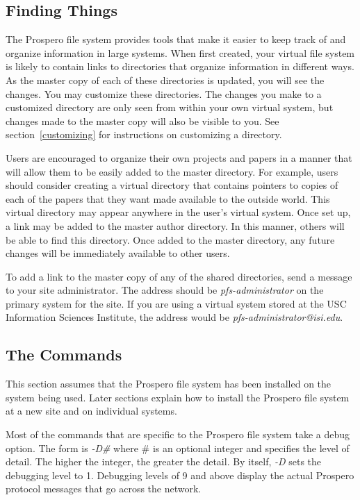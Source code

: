 \subsection{Finding Things}

The Prospero file system provides tools that make it easier to keep
track of and organize information in large systems.  When first
created, your virtual file system is likely to contain links to
directories that organize information in different ways.  As the
master copy of each of these directories is updated, you will see the
changes.  You may customize these directories.  The changes you make
to a customized directory are only seen from within your own virtual
system, but changes made to the master copy will also be visible to
you.  See section~\ref{customizing} for instructions on customizing a
directory.

Users are encouraged to organize their own projects and papers in a
manner that will allow them to be easily added to the master
directory.  For example, users should consider creating a virtual
directory that contains pointers to copies of each of the papers that
they want made available to the outside world.  This virtual directory
may appear anywhere in the user's virtual system.  Once set up, a link
may be added to the master author directory.  In this manner, others
will be able to find this directory.  Once added to the master
directory, any future changes will be immediately available to other
users.

To add a link to the master copy of any of the shared directories,
send a message to your site administrator.  The address should be {\it
pfs-administrator} on the primary system for the site.  If you are
using a virtual system stored at the USC Information Sciences Institute, the
address would be {\it pfs-administrator@isi.edu}.

\subsection{The Commands}

This section 
assumes that the Prospero file system has been installed on the system
being used.  Later sections explain how to install the Prospero file
system at a new site and on individual systems.

Most of the commands that are specific to the Prospero file system
take a debug option.  The form is {\em -D\#} where \# is an optional
integer and specifies the level of detail.  The higher the integer,
the greater the detail.  By itself, {\em -D} sets the debugging level
to 1.  Debugging levels of 9 and above display the actual Prospero
protocol messages that go across the network.  

